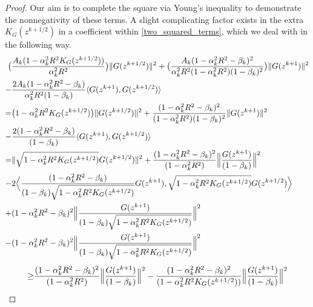 \documentclass[11pt,reqno,oneside]{amsart}
\theoremstyle{definition}
\numberwithin{equation}{section}
\begin{document}
\begin{proof}
    Our aim is to complete the square via Young's inequality to demonstrate the nonnegativity of these terms.
    A slight complicating factor exists in the extra $K_{G}(z^{k+1/2})$ in a coefficient within \eqref{two_squared_terms}, which we deal with in the following way.
    \begin{align}
        \big{(}& \frac{A_{k}(1 - \alpha_{k}^{2}R^{2}K_{G}(z^{k+1/2}))}{\alpha_{k}^{2}R^{2}}\big{)}\|G(z^{k + 1/2})\|^{2} + \big{(} \frac{A_{k}(1 - \alpha_{k}^{2}R^{2} - \beta_{k})^{2}}{\alpha_{k}^{2}R^{2}(1 - \alpha_{k}^{2}R^{2})(1 - \beta_{k})^{2}}\big{)}\|G(z^{k+1})\|^{2} \notag \\
        -&\frac{2A_{k}(1 - \alpha_{k}^{2}R^{2} -\beta_{k})}{\alpha_{k}^{2}R^{2}(1 - \beta_{k})}\langle G(z^{k+1}),G(z^{k+1/2}) \rangle \notag \\
        =&\big{(} 1 - \alpha_{k}^{2}R^{2}K_{G}(z^{k+1/2})\big{)}\|G(z^{k + 1/2})\|^{2} + \frac{(1 - \alpha_{k}^{2}R^{2} - \beta_{k})^{2}}{(1 - \alpha_{k}^{2}R^{2})(1 - \beta_{k})^{2}}\|G(z^{k+1})\|^{2} \notag \\
        -&\frac{2(1 - \alpha_{k}^{2}R^{2} -\beta_{k})}{(1 - \beta_{k})}\langle G(z^{k+1}),G(z^{k+1/2}) \rangle \label{lose_the_coefficient} \\
        =& \|\sqrt{1 - \alpha_{k}^{2}R^{2}K_{G}(z^{k+1/2})}G(z^{k + 1/2})\|^{2} + \frac{(1 - \alpha_{k}^{2}R^{2} - \beta_{k})^{2}}{(1 - \alpha_{k}^{2}R^{2})}\Big{\|}\frac{G(z^{k+1})}{(1 - \beta_{k})}\Big{\|}^{2} \notag \\
        -&2\Big{\langle} \frac{(1 - \alpha_{k}^{2}R^{2} - \beta_{k})}{(1 - \beta_{k})\sqrt{1 - \alpha_{k}^{2}R^{2}K_{G}(z^{k+1/2})}}G(z^{k+1}),\sqrt{1 - \alpha_{k}^{2}R^{2}K_{G}(z^{k+1/2})}G(z^{k+1/2}) \Big{\rangle} \notag \\
        +&(1 - \alpha_{k}^{2}R^{2} - \beta_{k})^{2}\Big{\|}\frac{G(z^{k+1})}{(1 - \beta_{k})\sqrt{1 - \alpha_{k}^{2}R^{2}K_{G}(z^{k+1/2})}}\Big{\|}^{2} \notag \\
        -&(1 - \alpha_{k}^{2}R^{2} - \beta_{k})^{2}\Big{\|}\frac{G(z^{k+1})}{(1 - \beta_{k})\sqrt{1 - \alpha_{k}^{2}R^{2}K_{G}(z^{k+1/2})}}\Big{\|}^{2} \notag \\
    \end{align}
\begin{align}
        \geq & \frac{(1 - \alpha_{k}^{2}R^{2} - \beta_{k})^{2}}{(1 - \alpha_{k}^{2}R^{2})}\Big{\|}\frac{G(z^{k+1})}{(1 - \beta_{k})}\Big{\|}^{2} - \frac{(1 - \alpha_{k}^{2}R^{2} - \beta_{k})^{2}}{(1 - \alpha_{k}^{2}R^{2}K_{G}(z^{k+1/2}))}\Big{\|} \frac{G(z^{k+1})}{(1 - \beta_{k})} \Big{\|}^{2} \label{app_of_YE} \\

\end{align}
\end{proof}
\end{document}
